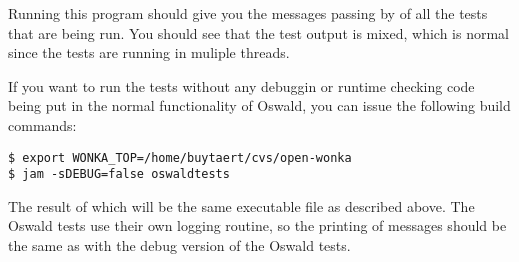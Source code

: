 Running this program should give you the messages passing by of all the
tests that are being run. You should see that the test output is mixed,
which is normal since the tests are running in muliple threads.

If you want to run the tests without any debuggin or runtime checking code
being put in the normal functionality of Oswald, you can issue the following
build commands:

\begin{verbatim}
$ export WONKA_TOP=/home/buytaert/cvs/open-wonka
$ jam -sDEBUG=false oswaldtests
\end{verbatim}

The result of which will be the same executable file as described above. The
Oswald tests use their own logging routine, so the printing of messages
should be the same as with the debug version of the Oswald tests.
